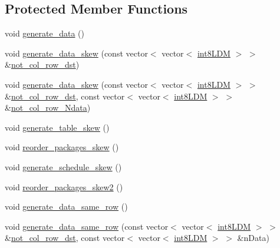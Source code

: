 \subsection*{Protected Member Functions}
\begin{DoxyCompactItemize}
\item 
void \mbox{\hyperlink{classRlmpiInitializer_ab93e99398a7d1ef2a21748260945d0ef}{generate\+\_\+data}} ()
\item 
void \mbox{\hyperlink{classRlmpiInitializer_a538c284d2e67fbbdcbeb4e05aaaa546a}{generate\+\_\+data\+\_\+skew}} (const vector$<$ vector$<$ \mbox{\hyperlink{include_2RlmpiShared_8h_a69782ffde89d45e86308f10afedf08a6}{int8\+L\+DM}} $>$ $>$ \&\mbox{\hyperlink{classRlmpiInitializer_afb1edb3cd0884d3057dc3b6e89a9c6cb}{not\+\_\+col\+\_\+row\+\_\+dst}})
\item 
void \mbox{\hyperlink{classRlmpiInitializer_ab02ee7a3cbda15a39f3e2e7218c92cc2}{generate\+\_\+data\+\_\+skew}} (const vector$<$ vector$<$ \mbox{\hyperlink{include_2RlmpiShared_8h_a69782ffde89d45e86308f10afedf08a6}{int8\+L\+DM}} $>$ $>$ \&\mbox{\hyperlink{classRlmpiInitializer_afb1edb3cd0884d3057dc3b6e89a9c6cb}{not\+\_\+col\+\_\+row\+\_\+dst}}, const vector$<$ vector$<$ \mbox{\hyperlink{include_2RlmpiShared_8h_a69782ffde89d45e86308f10afedf08a6}{int8\+L\+DM}} $>$ $>$ \&\mbox{\hyperlink{classRlmpiInitializer_ab3b8cf4ea6b320b091146b42d59ee60d}{not\+\_\+col\+\_\+row\+\_\+\+Ndata}})
\item 
void \mbox{\hyperlink{classRlmpiInitializer_a2a7ecc728bf06dc067eff4ee840c75d5}{generate\+\_\+table\+\_\+skew}} ()
\item 
void \mbox{\hyperlink{classRlmpiInitializer_aec2c94d2955c58dfd9cca03246f611f0}{reorder\+\_\+packages\+\_\+skew}} ()
\item 
void \mbox{\hyperlink{classRlmpiInitializer_aeaae3b1df67f30839f27bcbeb903aa34}{generate\+\_\+schedule\+\_\+skew}} ()
\item 
void \mbox{\hyperlink{classRlmpiInitializer_a0aad9839bd42a9dd2e84e8ec0c3adb89}{reorder\+\_\+packages\+\_\+skew2}} ()
\item 
void \mbox{\hyperlink{classRlmpiInitializer_aea9d8bac987da51da34638506f1bb844}{generate\+\_\+data\+\_\+same\+\_\+row}} ()
\item 
void \mbox{\hyperlink{classRlmpiInitializer_aad9919df0a82470522b25994dedeaf4e}{generate\+\_\+data\+\_\+same\+\_\+row}} (const vector$<$ vector$<$ \mbox{\hyperlink{include_2RlmpiShared_8h_a69782ffde89d45e86308f10afedf08a6}{int8\+L\+DM}} $>$ $>$ \&\mbox{\hyperlink{classRlmpiInitializer_afb1edb3cd0884d3057dc3b6e89a9c6cb}{not\+\_\+col\+\_\+row\+\_\+dst}}, const vector$<$ vector$<$ \mbox{\hyperlink{include_2RlmpiShared_8h_a69782ffde89d45e86308f10afedf08a6}{int8\+L\+DM}} $>$ $>$ \&n\+Data)

\end{DoxyCompactItemize}

